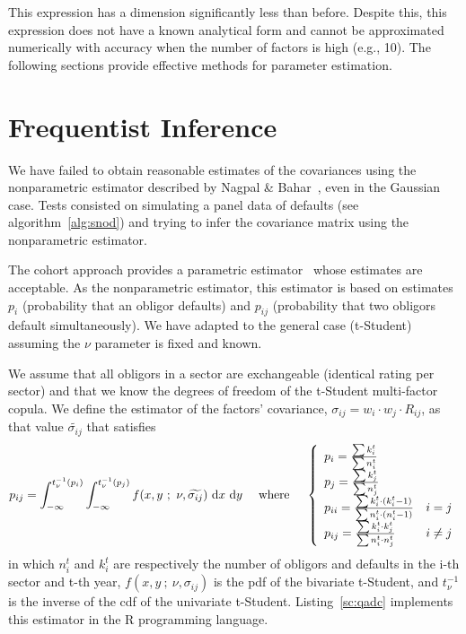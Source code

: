 \documentclass[11pt,fleqn]{book} %
\begin{document}
This expression has a dimension significantly less than before. Despite 
this, this expression does not have a known analytical form and cannot 
be approximated numerically with accuracy when the number of factors is 
high (e.g., 10). The following sections provide effective methods for 
parameter estimation.

\section{Frequentist Inference}

We have failed to obtain reasonable estimates of the covariances using the 
nonparametric estimator described by Nagpal \& Bahar~\cite{nagpal:2001}, even 
in the Gaussian case. Tests consisted on simulating a panel data of defaults 
(see algorithm~\ref{alg:snod}) and trying to infer the covariance matrix using 
the nonparametric estimator.

The cohort approach provides a parametric estimator~\cite[sec. 3.1]
{castro:2007} whose estimates are acceptable. As the nonparametric estimator, 
this estimator is based on estimates $p_i$ (probability that an obligor 
defaults) and $p_{ij}$ (probability that two obligors default simultaneously).
We have adapted to the general case (t-Student) assuming the $\nu$ parameter 
is fixed and known.

\begin{definition}
	We assume that all obligors in a sector are exchangeable (identical rating 
	per sector) and that we know the degrees of freedom of the t-Student 
	multi-factor copula. We define the estimator of the factors' covariance, 
	$\sigma_{ij} = w_i \cdot w_j \cdot R_{ij}$, as that value 
	$\widetilde{\sigma_{ij}}$ that satisfies
	\begin{displaymath}
		p_{ij} = \displaystyle \int_{-\infty}^{t_{\nu}^{-1}(p_i)} \int_{-\infty}^{t_{\nu}^{-1}(p_j)} 
		f(x,y\ ;\ \nu, \widetilde{\sigma_{ij}}) \mathop{\,\mathrm{{}d}}\mathopen{} x \mathop{\,\mathrm{{}d}}\mathopen{} y
		\quad \text{ where } \quad
		\left\{
			\begin{array}{ll}
				p_i = \frac{\sum k_i^t}{\sum n_i^t} & \\
				p_j = \frac{\sum k_j^t}{\sum n_j^t} & \\
				p_{ii} = \frac{\sum k_i^t \cdot (k_i^t-1)}{\sum n_i^t \cdot (n_i^t-1)} & i = j \\
				p_{ij} = \frac{\sum k_i^t \cdot k_j^t}{\sum n_i^t \cdot n_j^t} & i \ne j \\
			\end{array}
		\right.
	\end{displaymath}
	in which $n_i^t$ and $k_i^t$ are respectively the number of obligors and 
	defaults in the i-th sector and t-th year, $f(x,y\ ;\ \nu,\sigma_{ij})$ 
	is the pdf of the bivariate t-Student, and $t_{\nu}^{-1}$ is the inverse 
	of the cdf of the univariate t-Student. Listing~\ref{sc:qadc} implements 
	this estimator in the R programming language.
\end{definition}
\end{document}

